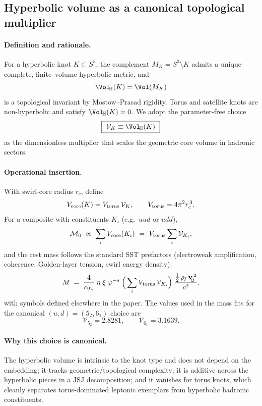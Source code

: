 \documentclass[11pt, preprint,titlepage]{revtex4-2}
\newcommand{\rhoF}{\rho_{\!f}}      %
\newcommand{\swirlarrow}{\!\!\scriptsize\boldsymbol{\circlearrowleft}}
\newcommand{\vswirl}{\mathbf{v}_{\swirlarrow}}
\begin{document}
	\subsection*{Hyperbolic volume as a canonical topological multiplier}
	\label{sec:hyp-volume}

		\paragraph{Definition and rationale.}
		For a hyperbolic knot \(K\subset S^3\), the complement \(M_K=S^3\!\setminus\!K\) admits a unique complete, finite–volume hyperbolic metric, and
		\[
		\Vol_{\!\mathbb{H}}(K)=\Vol(M_K)
		\]
		is a topological invariant by Mostow–Prasad rigidity. Torus and satellite knots are non-hyperbolic and satisfy \(\Vol_{\!\mathbb{H}}(K)=0\). We adopt the parameter-free choice
		\[
		\boxed{\ \mathcal V_K \equiv \Vol_{\!\mathbb{H}}(K)\ }
		\]
		as the dimensionless multiplier that scales the geometric core volume in hadronic sectors.

		\paragraph{Operational insertion.}
		With swirl-core radius \(r_c\), define
		\[
		V_{\rm core}(K)=V_{\rm torus}\,\mathcal V_K,\qquad
		V_{\rm torus}=4\pi^2 r_c^{\,3}.
		\]
		For a composite with constituents \(K_i\) (e.g.\ \(uud\) or \(udd\)),
		\[
		\mathcal M_0\ \propto\ \sum_i V_{\rm core}(K_i)
		\ =\ V_{\rm torus}\sum_i \mathcal V_{K_i},
		\]
		and the rest mass follows the standard SST prefactors (electroweak amplification, coherence, Golden-layer tension, swirl energy density):
		\[
		M \;=\; \frac{4}{\alpha_{\!fs}}\;\eta\;\xi\;\varphi^{-s}\;
		\Big(\sum_i V_{\rm torus}\,\mathcal{V}_{K_i}\Big)\;
		\frac{\tfrac12\,\rhoF\,\vswirl^{\,2}}{c^2},
		\]
		with symbols defined elsewhere in the paper. The values used in the mass fits for the canonical \((u,d)=(5_2, 6_1)\) choice are
		\[
		\mathcal{V}_{5_2}=2.8281,\qquad
		\mathcal{V}_{6_1}=3.1639.
		\]

		\paragraph{Why this choice is canonical.}
		The hyperbolic volume is intrinsic to the knot type and does not depend on the embedding; it tracks geometric/topological complexity; it is additive across the hyperbolic pieces in a JSJ decomposition; and it vanishes for torus knots, which cleanly separates torus-dominated leptonic exemplars from hyperbolic hadronic constituents.
\end{document}
